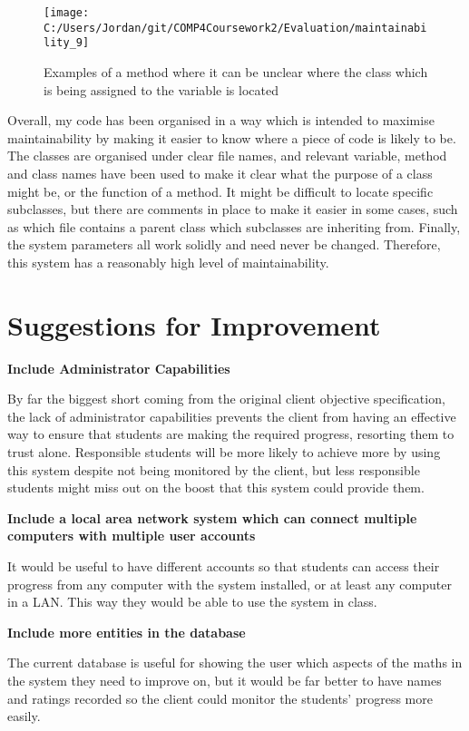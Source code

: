 \begin{figure}[H]
	\texttt{[image: C:/Users/Jordan/git/COMP4Coursework2/Evaluation/maintainability\_9]}
	\caption{Examples of a method where it can be unclear where the class which is being assigned to the variable is located}
\end{figure}

Overall, my code has been organised in a way which is intended to maximise maintainability by making it easier to know where a piece of code is likely to be. The classes are organised under clear file names, and relevant variable, method and class names have been used to make it clear what the purpose of a class might be, or the function of a method. It might be difficult to locate specific subclasses, but there are comments in place to make it easier in some cases, such as which file contains a parent class which subclasses are inheriting from. Finally, the system parameters all work solidly and need never be changed. Therefore, this system has a reasonably high level of maintainability.

\section{Suggestions for Improvement}

\textbf{Include Administrator Capabilities}

By far the biggest short coming from the original client objective specification, the lack of administrator capabilities prevents the client from having an effective way to ensure that students are making the required progress, resorting them to trust alone. Responsible students will be more likely to achieve more by using this system despite not being monitored by the client, but less responsible students might miss out on the boost that this system could provide them.

\textbf{Include a local area network system which can connect multiple computers with multiple user accounts}

It would be useful to have different accounts so that students can access their progress from any computer with the system installed, or at least any computer in a LAN. This way they would be able to use the system in class.

\textbf{Include more entities in the database}

The current database is useful for showing the user which aspects of the maths in the system they need to improve on, but it would be far better to have names and ratings recorded so the client could monitor the students' progress more easily.

